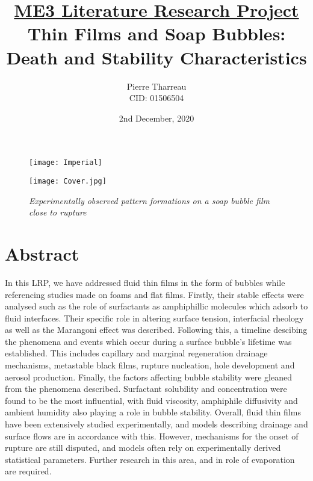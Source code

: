 \documentclass[a4paper,12pt]{article}
\numberwithin{equation}{section}
\numberwithin{figure}{section}
\numberwithin{table}{section}
\begin{document}
\begin{figure} [t]
    \texttt{[image: Imperial]}
\end{figure}



\title{\large \underline{ME3 Literature Research Project} \\ \huge Thin Films and Soap Bubbles: Death and Stability Characteristics}

\date{2nd December, 2020}
\author{Pierre Tharreau \\ CID: 01506504}
\maketitle

\begin{figure} [h]
    \centering
    \captionsetup{width=.9\linewidth}
    \texttt{[image: Cover.jpg]}
    \caption*{\textit{Experimentally observed pattern formations on a soap bubble film close to rupture \cite{Shen2020}}}
\end{figure}


\newpage
{}

\section*{Abstract}
In this LRP, we have addressed fluid thin films in the form of bubbles while referencing studies made on foams and flat films. Firstly, their stable effects were analysed such as the role of surfactants as amphiphillic molecules which adsorb to fluid interfaces. Their specific role in altering surface tension, interfacial rheology as well as the Marangoni effect was described. Following this, a timeline descibing the phenomena and events which occur during a surface bubble's lifetime was established. This includes capillary and marginal regeneration drainage mechanisms, metastable black films, rupture nucleation, hole development and aerosol production. Finally, the factors affecting bubble stability were gleaned from the phenomena described. Surfactant solubility and concentration were found to be the most influential, with fluid viscosity, amphiphile diffusivity and ambient humidity also playing a role in bubble stability. Overall, fluid thin films have been extensively studied experimentally, and models describing drainage and surface flows are in accordance with this. However, mechanisms for the onset of rupture are still disputed, and models often rely on experimentally derived statistical parameters. Further research in this area, and in role of evaporation are required.
\end{document}
